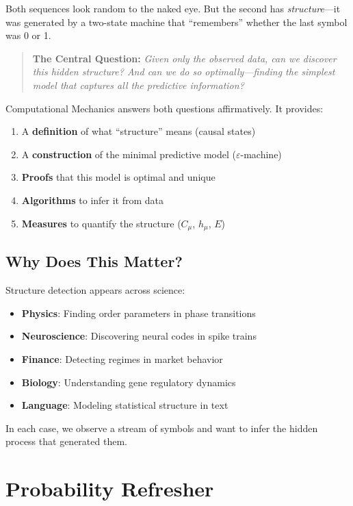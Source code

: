 \documentclass[11pt,a4paper]{article}
\theoremstyle{definition}
\theoremstyle{plain}
\newcommand{\eps}{\varepsilon}
\newcommand{\Cmu}{C_\mu}
\newcommand{\hmu}{h_\mu}
\begin{document}
Both sequences look random to the naked eye. But the second has \emph{structure}---it was generated by a two-state machine that ``remembers'' whether the last symbol was 0 or 1.

\begin{quote}
\textbf{The Central Question:} \emph{Given only the observed data, can we discover this hidden structure? And can we do so optimally---finding the simplest model that captures all the predictive information?}
\end{quote}

Computational Mechanics answers both questions affirmatively. It provides:
\begin{enumerate}
    \item A \textbf{definition} of what ``structure'' means (causal states)
    \item A \textbf{construction} of the minimal predictive model ($\eps$-machine)
    \item \textbf{Proofs} that this model is optimal and unique
    \item \textbf{Algorithms} to infer it from data
    \item \textbf{Measures} to quantify the structure ($\Cmu$, $\hmu$, $E$)
\end{enumerate}

\subsection{Why Does This Matter?}

Structure detection appears across science:
\begin{itemize}
    \item \textbf{Physics}: Finding order parameters in phase transitions
    \item \textbf{Neuroscience}: Discovering neural codes in spike trains
    \item \textbf{Finance}: Detecting regimes in market behavior
    \item \textbf{Biology}: Understanding gene regulatory dynamics
    \item \textbf{Language}: Modeling statistical structure in text
\end{itemize}

In each case, we observe a stream of symbols and want to infer the hidden process that generated them.

\section{Probability Refresher}
\label{sec:probability}
\end{document}
